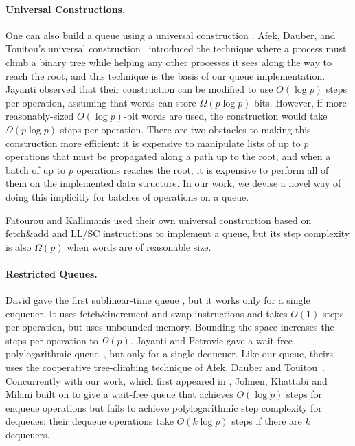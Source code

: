 \paragraph{Universal Constructions.}
One can also build a queue using a universal construction \cite{10.1145/114005.102808}.
Afek, Dauber, and Touitou's universal construction~\cite{DBLP:conf/stoc/AfekDT95}
introduced the technique where a process must climb a binary tree while helping any other processes it sees along the way to reach the root,
and this technique is the basis of our queue implementation.
Jayanti \cite{DBLP:conf/podc/Jayanti98a} observed that
their construction can be modified to use $O(\log p)$ steps per operation, 
assuming that words can store $\Omega(p \log p)$ bits. 
However, if more reasonably-sized $O(\log p)$-bit words are used, the construction would take $\Omega(p\log p)$ steps per operation.
There are two obstacles to making this construction more efficient:
it is expensive to manipulate lists of up to $p$ operations that must be propagated along a path
up to the root, and
when a batch of up to $p$ operations reaches the root, it is expensive to perform all of them on the
implemented data structure.
In our work, we devise a novel way of doing this implicitly for batches of operations on a queue.

Fatourou and Kallimanis \cite{FK14} used their own universal construction based on fetch\&add and LL/SC instructions
to implement a queue, but its step complexity is also $\Omega(p)$ when words are of reasonable size.

\paragraph{Restricted Queues.}
David gave the first sublinear-time queue
\cite{DBLP:conf/wdag/David04}, but it works only for a single enqueuer.
It uses fetch\&increment and swap  instructions and takes $O(1)$ steps per operation, but
uses unbounded memory.  Bounding the space increases the steps per operation to $\Omega(p)$.
Jayanti and Petrovic gave a wait-free polylogarithmic
queue~\cite{DBLP:conf/fsttcs/JayantiP05}, but only for a single dequeuer. 
Like our queue, theirs uses the cooperative tree-climbing
technique of Afek, Dauber and Touitou~\cite{DBLP:conf/stoc/AfekDT95}.
Concurrently with our work, which first appeared in \cite{Nad22}, Johnen, Khattabi and Milani \cite{JKM23} built on \cite{DBLP:conf/fsttcs/JayantiP05} to give a wait-free queue  
that achieves $O(\log p)$ steps for enqueue operations but fails to achieve polylogarithmic step complexity for dequeues: their dequeue operations take $O(k \log p)$ steps if there are $k$ dequeuers.

